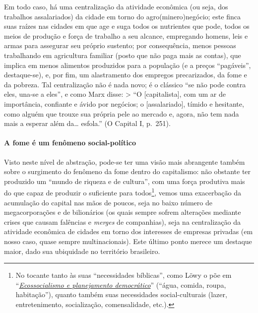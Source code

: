 Em todo caso, há uma centralização da atividade econômica (ou seja, dos
trabalhos assalariados) da cidade em torno do agro(minero)negócio; este
finca suas raízes nas cidades em que age e suga todos os nutrientes que
pode, todos os meios de produção e força de trabalho a seu alcance,
empregando homens, leis e armas para assegurar seu próprio sustento; por
consequência, menos pessoas trabalhando em agricultura familiar (posto
que não paga mais as contas), que implica em menos alimentos produzidos
para a população (e a preços ``pagáveis'', destaque-se), e, por fim, um
alastramento dos empregos precarizados, da fome e da pobreza. Tal
centralização não é nada novo; é o clássico ``se não pode contra eles,
una-se a eles'', e como Marx disse: \textgreater{} ``O
{[}capitalista{]}, com um ar de importância, confiante e ávido por
negócios; o {[}assalariado{]}, tímido e hesitante, como alguém que
trouxe sua própria pele ao mercado e, agora, não tem nada mais a esperar
além da\ldots{} esfola.'' (O Capital I, p.~251).

\hypertarget{a-fome-uxe9-um-fenuxf4meno-social-poluxedtico}{%
\paragraph{A fome é um fenômeno
social-político}\label{a-fome-uxe9-um-fenuxf4meno-social-poluxedtico}}

Visto neste nível de abstração, pode-se ter uma visão mais abrangente
também sobre o surgimento do fenômeno da fome dentro do capitalismo: não
obstante ter produzido um ``mundo de riqueza e de cultura'', com uma
força produtiva mais do que capaz de produzir o suficiente para
todos\footnote{No tocante tanto às suas ``necessidades bíblicas'', como
  Löwy o põe em
  ``\href{https://www.ifch.unicamp.br/criticamarxista/arquivos_biblioteca/artigo164artigo2.pdf}{\textit{Ecossocialismo e planejamento democrático}}''
  (``água, comida, roupa, habitação''), quanto também suas necessidades
  social-culturais (lazer, entretenimento, socialização, comensalidade,
  etc.).}, vemos uma exacerbação da acumulação do capital nas mãos de
poucos, seja no baixo número de megacorporações e de bilionários (os
quais sempre sofrem alterações mediante crises que causam falências e
\textit{merges} de companhias), seja na centralização da atividade
econômica de cidades em torno dos interesses de empresas privadas (em
nosso caso, quase sempre multinacionais). Este último ponto merece um
destaque maior, dado sua ubiquidade no território brasileiro.

